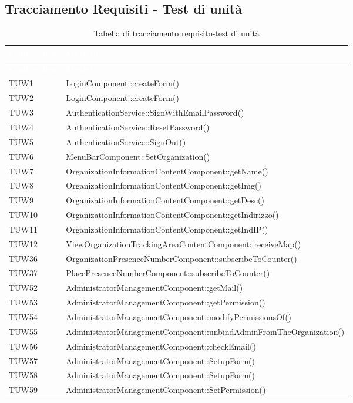 \subsection{Tracciamento Requisiti - Test di unità}
{
\renewcommand{\arraystretch}{1.5}
\centering
\begin{longtable}{C{2cm} C{8cm}}
\caption{Tabella di tracciamento requisito-test di unità}\\
\textcolor{white}{\textbf{Codice Test}} & \textcolor{white}{\textbf{Metodo}}\\	
\endfirsthead
{}
\textcolor{white}{\textbf{Codice Test}} & \textcolor{white}{\textbf{Metodo}}\\	
\endhead

TUW1 & LoginComponent::createForm() \\
TUW2 & LoginComponent::createForm() \\
TUW3 & AuthenticationService::SignWithEmailPassword() \\
TUW4 & AuthenticationService::ResetPassword() \\
TUW5 & AuthenticationService::SignOut() \\
TUW6 & MenuBarComponent::SetOrganization() \\
TUW7 & OrganizationInformationContentComponent::getName() \\
TUW8 & OrganizationInformationContentComponent::getImg() \\
TUW9 & OrganizationInformationContentComponent::getDesc() \\
TUW10 & OrganizationInformationContentComponent::getIndirizzo() \\
TUW11 & OrganizationInformationContentComponent::getIndIP() \\
TUW12 & ViewOrganizationTrackingAreaContentComponent::receiveMap() \\
TUW36 & OrganizationPresenceNumberComponent::subscribeToCounter() \\
TUW37 & PlacePresenceNumberComponent::subscribeToCounter() \\
TUW52 & AdministratorManagementComponent::getMail()\\
TUW53 & AdministratorManagementComponent::getPermission()\\
TUW54 & AdministratorManagementComponent::modifyPermissionsOf()\\
TUW55 & AdministratorManagementComponent::unbindAdminFromTheOrganization()\\
TUW56 & AdministratorManagementComponent::checkEmail()\\
TUW57 & AdministratorManagementComponent::SetupForm()\\
TUW58 & AdministratorManagementComponent::SetupForm()\\
TUW59 & AdministratorManagementComponent::SetPermission()\\

\end{longtable}
}